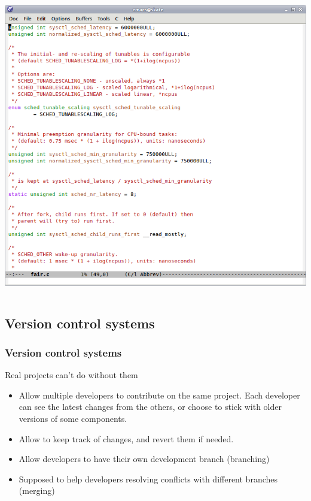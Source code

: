\begin{frame}
\begin{columns}[T]
{    \includegraphics[height=0.38\textheight]{slides/sysdev-application-development/emacs-screenshot.png}
    }
  \end{columns}
\end{frame}

\subsection{Version control systems}

\begin{frame}
  \frametitle{Version control systems}
  Real projects can't do without them
  \begin{itemize}
  \item Allow multiple developers to contribute on the same
    project. Each developer can see the latest changes from the
    others, or choose to stick with older versions of some components.
  \item Allow to keep track of changes, and revert them if needed.
  \item Allow developers to have their own development branch
    (branching)
  \item Supposed to help developers resolving conflicts with different
    branches (merging)
  \end{itemize}
\end{frame}

